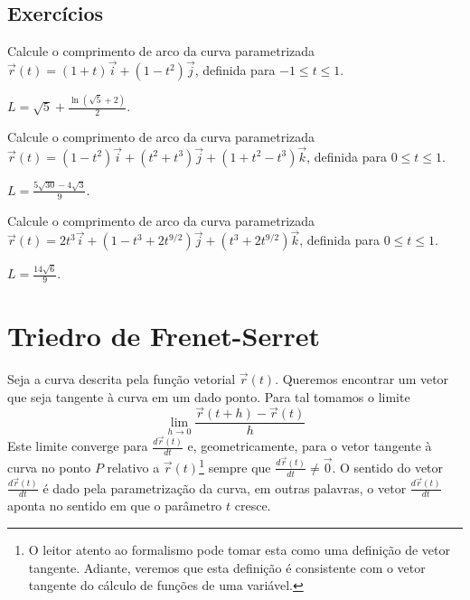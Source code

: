 \subsection*{Exercícios}

\begin{exer} \label{exe_co_arc3}
Calcule o comprimento de arco da curva parametrizada $\vec{r}(t) = (1+t) \vec{i} + (1-t^2)\vec{j}$, definida para $-1 \leq t \leq 1$.
\end{exer}
\begin{resp}
  $L=\sqrt{5} + \frac{\ln(\sqrt{5}+2)}{2}$.
\end{resp}


\begin{exer} \label{exe_co_arc4}
Calcule o comprimento de arco da curva parametrizada $\vec{r}(t) = (1-t^2) \vec{i} + (t^2+t^3) \vec{j} + (1+t^2-t^3)\vec{k}$, definida para $0 \leq t \leq 1$.
\end{exer}
\begin{resp} $ L = \frac{5 \sqrt{30}-4\sqrt{3}}{9} $.
\end{resp}



\begin{exer} \label{exe_co_arc5}
Calcule o comprimento de arco da curva parametrizada $\vec{r}(t) = 2t^3 \vec{i} + (1-t^3+2t^{9/2}) \vec{j} + (t^3+2t^{9/2})\vec{k}$, definida para $0 \leq t \leq 1$.
\end{exer}
\begin{resp}
  $ L = \frac{14\sqrt{6}}{9}.$
\end{resp}



\section{Triedro de Frenet-Serret}

Seja a curva descrita pela função vetorial $\vec{r}(t)$. Queremos encontrar um vetor que seja tangente à curva em um dado ponto. Para tal tomamos o limite
$$\lim_{h\to 0} \frac{\vec{r}(t+h)-\vec{r}(t)}{h}$$
Este limite converge para $\frac{d\vec{r}(t)}{dt}$ e, geometricamente, para o vetor tangente à curva no ponto $P$ relativo a $\vec{r}(t)$\footnote{O leitor atento ao formalismo pode tomar esta como uma definição de vetor tangente. Adiante, veremos que esta definição é consistente com o vetor tangente do cálculo de funções de uma variável.} sempre que $\frac{d\vec{r}(t)}{dt} \neq \vec{0}$. O sentido do vetor $\frac{d\vec{r}(t)}{dt}$ é dado pela parametrização da curva, em outras palavras, o vetor $\frac{d\vec{r}(t)}{dt}$ aponta no sentido em que o parâmetro $t$ cresce.


